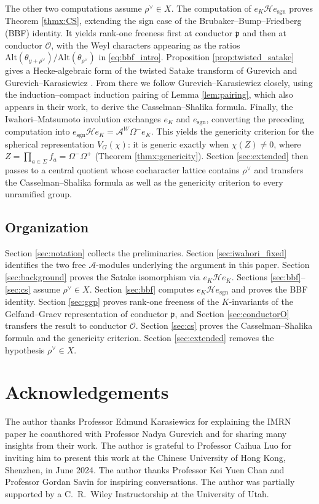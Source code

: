 \documentclass[12pt]{article}
\numberwithin{equation}{section}
\theoremstyle{definition}
\theoremstyle{remark}
\theoremstyle{plain}
\begin{document}
The other two computations assume $\rho^\vee\in X$. The computation of $e_K\mathcal{H}e_{\mathrm{sgn}}$ proves Theorem \ref{thmx:CS}, extending the sign case of the Brubaker--Bump--Friedberg (BBF) identity. It yields rank-one freeness first at conductor $\mathfrak p$ and then at conductor $\mathcal O$, with the Weyl characters appearing as the ratios $\mathrm{Alt}(\theta_{y+\rho^\vee})/\mathrm{Alt}(\theta_{\rho^\vee})$ in \eqref{eq:bbf_intro}. Proposition \ref{prop:twisted_satake} gives a Hecke-algebraic form of the twisted Satake transform of Gurevich and Gurevich--Karasiewicz \cite{Gu13, GK22}. From there we follow Gurevich--Karasiewicz closely, using the induction--compact induction pairing of Lemma \ref{lem:pairing}, which also appears in their work, to derive the Casselman--Shalika formula. Finally, the Iwahori--Matsumoto involution exchanges $e_K$ and $e_{\mathrm{sgn}}$, converting the preceding computation into $e_{\mathrm{sgn}}\mathcal H e_K=\mathcal A^W\Omega^-e_K$. This yields the genericity criterion for the spherical representation $V_G(\chi)$: it is generic exactly when $\chi(Z)\neq0$, where $Z=\prod_{a\in\Sigma}f_a=\Omega^-\Omega^+$ (Theorem \ref{thmx:genericity}). Section \ref{sec:extended} then passes to a central quotient whose cocharacter lattice contains $\rho^\vee$ and transfers the Casselman--Shalika formula as well as the genericity criterion to every unramified group.

\subsection*{Organization}

Section \ref{sec:notation} collects the preliminaries. Section \ref{sec:iwahori_fixed} identifies the two free $\mathcal{A}$-modules underlying the argument in this paper. Section \ref{sec:background} proves the Satake isomorphism via $e_K\mathcal{H}e_K$. Sections \ref{sec:bbf}--\ref{sec:cs} assume $\rho^\vee\in X$. Section \ref{sec:bbf} computes $e_K\mathcal H e_{\mathrm{sgn}}$ and proves the BBF identity. Section \ref{sec:ggp} proves rank-one freeness of the $K$-invariants of the Gelfand--Graev representation of conductor $\mathfrak p$, and Section \ref{sec:conductorO} transfers the result to conductor $\mathcal O$. Section \ref{sec:cs} proves the Casselman--Shalika formula and the genericity criterion. Section \ref{sec:extended} removes the hypothesis $\rho^\vee\in X$.


\section*{Acknowledgements}
The author thanks Professor Edmund Karasiewicz for explaining the IMRN paper he coauthored with Professor Nadya Gurevich and for sharing many insights from their work. The author is grateful to Professor Caihua Luo for inviting him to present this work at the Chinese University of Hong Kong, Shenzhen, in June 2024. The author thanks Professor Kei Yuen Chan and Professor Gordan Savin for inspiring conversations. The author was partially supported by a C.~R.~Wiley Instructorship at the University of Utah.
\end{document}
